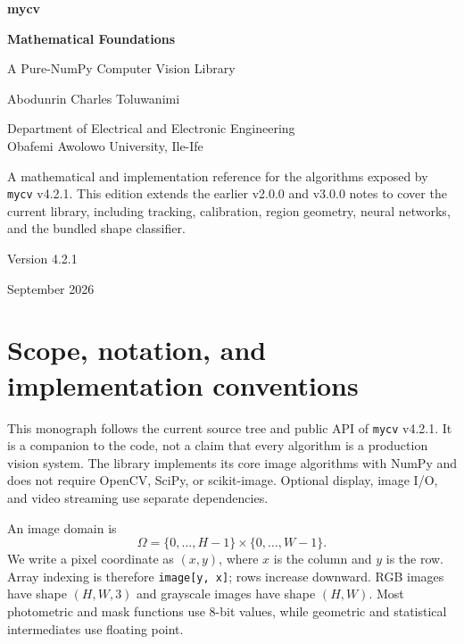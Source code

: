 \documentclass[11pt,a4paper]{article}
\newcommand{\1}{\mathbf{1}}
\newcommand{\mycv}{\texttt{mycv}}
\begin{document}
\begin{titlepage}
  \centering
  \vspace*{22mm}
  {\Large\sffamily\bfseries\color{blue} mycv\par}
  \vspace{6mm}
  {\huge\bfseries\color{ink} Mathematical Foundations\par}
  \vspace{4mm}
  {\Large A Pure-NumPy Computer Vision Library\par}
  \vspace{13mm}
  {\large Abodunrin Charles Toluwanimi\par}
  \vspace{2mm}
  {\normalsize Department of Electrical and Electronic Engineering\\
  Obafemi Awolowo University, Ile-Ife\par}
  \vfill
  \begin{minipage}{0.82\textwidth}
  \centering\color{muted}
  A mathematical and implementation reference for the algorithms exposed by
  \mycv{} v4.2.1. This edition extends the earlier v2.0.0 and v3.0.0 notes to
  cover the current library, including tracking, calibration, region geometry,
  neural networks, and the bundled shape classifier.
  \end{minipage}
  \vfill
  {\large Version 4.2.1\par}
  \vspace{2mm}
  {\normalsize September 2026\par}
\end{titlepage}

\tableofcontents
\clearpage

\section{Scope, notation, and implementation conventions}

This monograph follows the current source tree and public API of \mycv{} v4.2.1.
It is a companion to the code, not a claim that every algorithm is a production
vision system. The library implements its core image algorithms with NumPy and
does not require OpenCV, SciPy, or scikit-image. Optional display, image I/O,
and video streaming use separate dependencies.

An image domain is
\[
  \Omega=\{0,\ldots,H-1\}\times\{0,\ldots,W-1\}.
\]
We write a pixel coordinate as $(x,y)$, where $x$ is the column and $y$ is the
row. Array indexing is therefore \texttt{image[y, x]}; rows increase downward. RGB
images have shape $(H,W,3)$ and grayscale images have shape $(H,W)$. Most
photometric and mask functions use 8-bit values, while geometric and statistical
intermediates use floating point.
\end{document}
